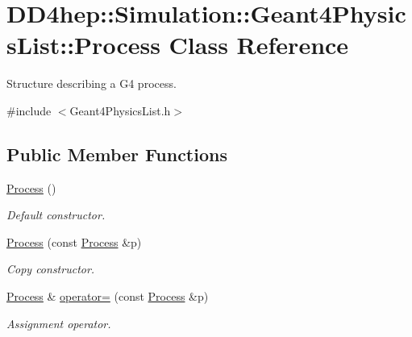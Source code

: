 \hypertarget{class_d_d4hep_1_1_simulation_1_1_geant4_physics_list_1_1_process}{
\section{DD4hep::Simulation::Geant4PhysicsList::Process Class Reference}
\label{class_d_d4hep_1_1_simulation_1_1_geant4_physics_list_1_1_process}
}


Structure describing a G4 process.  


{\ttfamily \#include $<$Geant4PhysicsList.h$>$}\subsection*{Public Member Functions}
\begin{DoxyCompactItemize}
\item 
\hyperlink{class_d_d4hep_1_1_simulation_1_1_geant4_physics_list_1_1_process_ac8ddef52a1287d02acdb83b769ee8c94}{Process} ()
\begin{DoxyCompactList}\small\item\em Default constructor. \item\end{DoxyCompactList}\item 
\hyperlink{class_d_d4hep_1_1_simulation_1_1_geant4_physics_list_1_1_process_a8a359fff64fa6b38ca4e8c26f55d82de}{Process} (const \hyperlink{class_d_d4hep_1_1_simulation_1_1_geant4_physics_list_1_1_process}{Process} \&p)
\begin{DoxyCompactList}\small\item\em Copy constructor. \item\end{DoxyCompactList}\item 
\hyperlink{class_d_d4hep_1_1_simulation_1_1_geant4_physics_list_1_1_process}{Process} \& \hyperlink{class_d_d4hep_1_1_simulation_1_1_geant4_physics_list_1_1_process_a979605cdba461548a4a86b9574ab4e60}{operator=} (const \hyperlink{class_d_d4hep_1_1_simulation_1_1_geant4_physics_list_1_1_process}{Process} \&p)
\begin{DoxyCompactList}\small\item\em Assignment operator. \item\end{DoxyCompactList}\end{DoxyCompactItemize}
